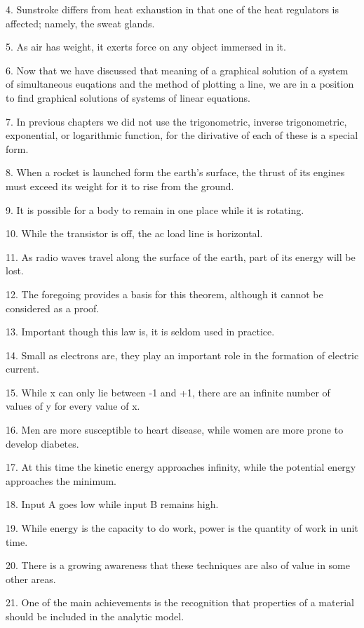 \documentclass[a4paper,twocolumn,10pt]{article}
\begin{document}
\begin{CJK}{UTF8}{gkai}
	4. Sunstroke differs from heat exhaustion in that one of the heat regulators is affected;
	namely, the sweat glands.

	5. As air has weight, it exerts force on any object immersed in it.

	6. Now that we have discussed that meaning of a graphical solution of a system
	of simultaneous euqations and the method of plotting a line, we are in a position
	to find graphical solutions of systems of linear equations.

	7. In previous chapters we did not use the trigonometric,
	inverse trigonometric, exponential, or logarithmic function, 
	for the dirivative of each of these is a special form.

	8. When a rocket is launched form the earth's surface, the thrust of its engines must
	exceed its weight for it to rise from the ground.

	9. It is possible for a body to remain in one place while it is rotating.

	10. While the transistor is off, the ac load line is horizontal.

	11. As radio waves travel along the surface of the earth, part of its energy
	will be lost.

	12. The foregoing provides a basis for this theorem, although it cannot be considered
	as a proof.

	13. Important though this law is, it is seldom used in practice.

	14. Small as electrons are, they play an important role in the formation of electric current.

	15. While x can only lie between -1 and +1, there are an infinite number of values of y for every value of x.

	16. Men are more susceptible to heart disease, while women are more prone to develop diabetes.

	17. At this time the kinetic energy approaches infinity, while the potential energy
	approaches the minimum.

	18. Input A goes low while input B remains high.

	19. While energy is the capacity to do work, power is the quantity of work in unit time.

	20. There is a growing awareness that these techniques are also of value in 
	some other areas.

	21. One of the main achievements is the recognition that properties of
	a material should be included in the analytic model.


\end{CJK}
\end{document}
